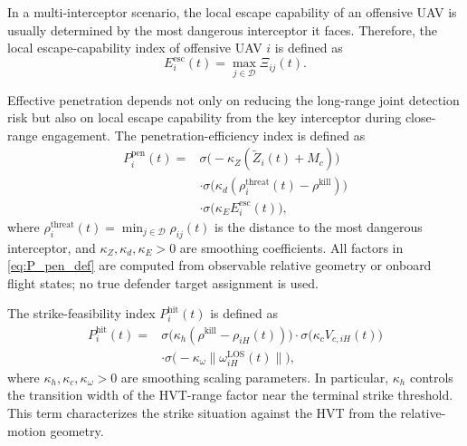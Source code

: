 \documentclass{cja}
\begin{document}
In a multi-interceptor scenario, the local escape capability of an offensive UAV is usually determined by the most dangerous interceptor it faces. Therefore, the local escape-capability index of offensive UAV $i$ is defined as
\begin{equation}
E_i^{\mathrm{esc}}(t)
=
\max_{j\in\mathcal{D}} \Xi_{ij}(t).
\end{equation}

Effective penetration depends not only on reducing the long-range joint detection risk but also on local escape capability from the key interceptor during close-range engagement. The penetration-efficiency index is defined as
\begin{equation}
\begin{aligned}
P_i^{\mathrm{pen}}(t)
={}&
\sigma\!\bigl(-\kappa_Z(\widetilde Z_i(t)+M_c)\bigr)\\
&\cdot
\sigma\!\bigl(\kappa_d(\rho_i^{\mathrm{threat}}(t)-\rho^{\mathrm{kill}})\bigr)\\
&\cdot
\sigma\!\bigl(\kappa_E E_i^{\mathrm{esc}}(t)\bigr),
\end{aligned}
\label{eq:P_pen_def}
\end{equation}
where $\rho_i^{\mathrm{threat}}(t)=\min_{j\in\mathcal{D}}\rho_{ij}(t)$ is the distance to the most dangerous interceptor, and $\kappa_Z,\kappa_d,\kappa_E>0$ are smoothing coefficients. All factors in \eqref{eq:P_pen_def} are computed from observable relative geometry or onboard flight states; no true defender target assignment is used.

The strike-feasibility index $P_i^{\mathrm{hit}}(t)$ is defined as
\begin{equation}
\begin{aligned}
P_i^{\mathrm{hit}}(t)
={}&
\sigma\!\bigl(\kappa_h(\rho^{\mathrm{kill}}-\rho_{iH}(t))\bigr)
\cdot
\sigma\!\bigl(\kappa_c V_{c,iH}(t)\bigr)\\
&\cdot
\sigma\!\bigl(-\kappa_{\omega}\|\omega_{iH}^{\mathrm{LOS}}(t)\|\bigr),
\end{aligned}
\label{eq:P_hit_def}
\end{equation}
where $\kappa_h,\kappa_c,\kappa_{\omega}>0$ are smoothing scaling parameters. In particular, $\kappa_h$ controls the transition width of the HVT-range factor near the terminal strike threshold. This term characterizes the strike situation against the HVT from the relative-motion geometry.
\end{document}
